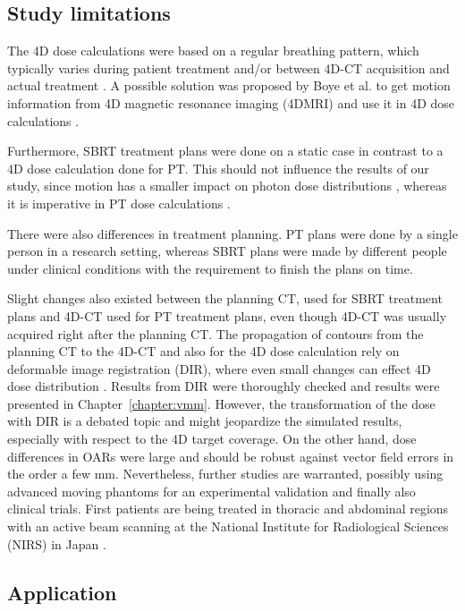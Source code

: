 \documentclass[type=dr, dr=rernat, acm$^3$entcolor=tud7b,colorbacktitle, bigchapter, openright, twoside, 12pt ]{tudthesis}
\begin{document}
\subsection{Study limitations}


The 4D dose calculations were based on a regular breathing pattern, which typically varies during patient treatment and/or between 4D-CT acquisition and actual treatment \cite{Verma2010, Malinowski2011}. 
A possible solution was proposed by Boye et al. to get motion information from 4D magnetic resonance imaging (4DMRI) and use it in 4D dose calculations \cite{Boye2013}.

Furthermore, SBRT treatment plans were done on a static case in contrast to a 4D dose calculation done for PT. This should not influence the results of our study, 
since motion has a smaller impact on photon dose distributions \cite{Zou2014}, whereas it is imperative in PT dose calculations \cite{Bert2011}. 

There were also differences in treatment planning. PT plans were done by a single person in a research setting, whereas SBRT plans were made by different people under clinical conditions with the requirement to finish the plans on time. 

Slight changes also existed between the planning CT, used for SBRT treatment plans and 4D-CT used for PT treatment plans, even though 4D-CT was usually acquired right after the planning CT. 
The propagation of contours from the planning CT to the 4D-CT and also for the 4D dose calculation rely on deformable image registration (DIR), where even small changes can effect 4D dose distribution \cite{Kashani2008}. 
Results from DIR were thoroughly checked and results were presented in Chapter~\ref{chapter:vmm}. However, the transformation of the dose with DIR is a debated topic and might jeopardize the simulated results, especially with respect to the 4D target coverage. On the other hand, dose differences 
in OARs were large and should be robust against vector field errors in the order a few mm. Nevertheless, further studies are warranted, possibly using advanced moving phantoms for an experimental 
validation \cite{Perrin2014} and finally also clinical trials. First patients are being treated in thoracic and abdominal regions with an active beam scanning at the National Institute for Radiological Sciences (NIRS) in Japan \cite{Mori2016}.



\subsection{Application}
\end{document}
